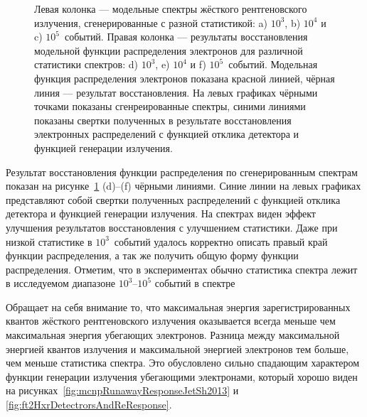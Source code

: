 \begin{figure}[ht!]
  \caption{ Левая колонка --- модельные спектры жёсткого рентгеновского излучения, сгенерированные с разной статистикой: a) $10^3$, b) $10^4$ и c) $10^5$~событий. Правая колонка --- результаты восстановления модельной функции распределения электронов для различной статистики спектров: d) $10^3$, e) $10^4$ и f) $10^5$~событий. Модельная функция распределения электронов показана красной линией, чёрная линия --- результат восстановления. На левых графиках чёрными точками показаны сгенреированные спектры, синими линиями показаны свертки полученных в результате восстановления электронных распределений с функцией отклика детектора и функцией генерации излучения.~\cite{Shevelev2016} }
  \label{fig:ft2TestReStatistics}
\end{figure}

Результат восстановления функции распределения по сгенерированным спектрам показан на рисунке~\ref{fig:ft2TestReStatistics} (d)--(f) чёрными линиями. Синие линии на левых графиках представляют собой свертки полученных распределений с функцией отклика детектора и функцией генерации излучения. На спектрах виден эффект улучшения результатов восстановления с улучшением статистики. Даже при низкой статистике в $10^3$~событий удалось корректно описать правый край функции распределения, а так же получить общую форму функции распределения. Отметим, что в экспериментах обычно статистика спектра лежит в исследуемом диапазоне $10^3$--$10^5$ событий в спектре~\cite{Shevelev2016}

Обращает на себя внимание то, что максимальная энергия зарегистрированных квантов жёсткого рентгеновского излучения оказывается всегда меньше чем максимальная энергия убегающих электронов. Разница между максимальной энергией квантов излучения и максимальной энергией электронов тем больше, чем меньше статистика спектра. Это обусловлено сильно спадающим характером функции генерации излучения убегающими электронами, который хорошо виден на рисунках~\ref{fig:mcnpRunawayResponseJetSh2013} и \ref{fig:ft2HxrDetectrorsAndReResponse}.~\cite{Shevelev2016}


